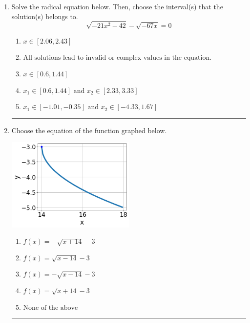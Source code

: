 \documentclass[14pt]{extbook}
\newcommand{\litem}[1]{\item#1\hspace*{-1cm}\rule{\textwidth}{0.4pt}}
\begin{document}
\begin{enumerate}
{\begin{enumerate}[label=\Alph*.]
\end{enumerate} }
\litem{
Solve the radical equation below. Then, choose the interval(s) that the solution(s) belongs to.\[ \sqrt{-21 x^2 - 42} - \sqrt{-67 x} = 0 \]\begin{enumerate}[label=\Alph*.]
\item \( x \in [2.06,2.43] \)
\item \( \text{All solutions lead to invalid or complex values in the equation.} \)
\item \( x \in [0.6,1.44] \)
\item \( x_1 \in [0.6, 1.44] \text{ and } x_2 \in [2.33,3.33] \)
\item \( x_1 \in [-1.01, -0.35] \text{ and } x_2 \in [-4.33,1.67] \)

\end{enumerate} }
\litem{
Choose the equation of the function graphed below.
\begin{center}
    \includegraphics[width=0.5\textwidth]{../Figures/radicalGraphToEquationCopyA.png}
\end{center}
\begin{enumerate}[label=\Alph*.]
\item \( f(x) = - \sqrt{x + 14} - 3 \)
\item \( f(x) = \sqrt{x - 14} - 3 \)
\item \( f(x) = - \sqrt{x - 14} - 3 \)
\item \( f(x) = \sqrt{x + 14} - 3 \)
\item \( \text{None of the above} \)


\end{enumerate}}
\end{enumerate}
\end{document}
